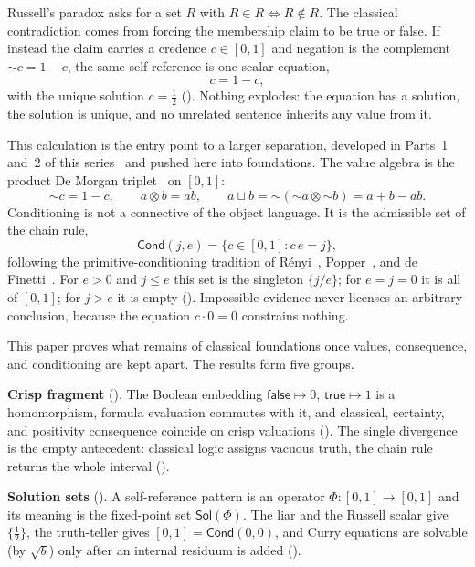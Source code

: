 \documentclass[11pt,a4paper]{article}
\newcommand{\negc}{\mathord{\sim}}
\newcommand{\conjc}{\otimes}
\newcommand{\disjc}{\sqcup}
\newcommand{\Cond}{\mathsf{Cond}}
\newcommand{\Sol}{\mathsf{Sol}}
\begin{document}
Russell's paradox asks for a set $R$ with
$R \in R \Leftrightarrow R \notin R$.
The classical contradiction comes from forcing the membership claim to
be true or false.
If instead the claim carries a credence $c \in [0,1]$ and negation is
the complement $\negc c = 1 - c$, the same self-reference is one scalar
equation,
\[
  c = 1 - c,
\]
with the unique solution $c = \tfrac12$ ().
Nothing explodes: the equation has a solution, the solution is unique,
and no unrelated sentence inherits any value from it.

This calculation is the entry point to a larger separation, developed
in Parts~1 and~2 of this series~\cite{part1,part2} and pushed here into
foundations.
The value algebra is the product De Morgan
triplet~\cite{klement2000,hajek1998} on $[0,1]$:
\[
  \negc c = 1 - c, \qquad
  a \conjc b = ab, \qquad
  a \disjc b = \negc(\negc a \conjc \negc b) = a + b - ab.
\]
Conditioning is not a connective of the object language.
It is the admissible set of the chain rule,
\[
  \Cond(j, e) = \{c \in [0,1] : c\,e = j\},
\]
following the primitive-conditioning tradition of
R\'enyi~\cite{renyi1955}, Popper~\cite{popper1959}, and
de Finetti~\cite{definetti1936}.
For $e > 0$ and $j \leq e$ this set is the singleton $\{j/e\}$; for
$e = j = 0$ it is all of $[0,1]$; for $j > e$ it is empty
().
Impossible evidence never licenses an arbitrary conclusion, because the
equation $c \cdot 0 = 0$ constrains nothing.

This paper proves what remains of classical foundations once values,
consequence, and conditioning are kept apart.
The results form five groups.

\textbf{Crisp fragment} ().
The Boolean embedding $\mathsf{false} \mapsto 0$,
$\mathsf{true} \mapsto 1$ is a homomorphism, formula evaluation
commutes with it, and classical, certainty, and positivity consequence
coincide on crisp valuations
().
The single divergence is the empty antecedent: classical logic assigns
vacuous truth, the chain rule returns the whole interval
().

\textbf{Solution sets} ().
A self-reference pattern is an operator $\Phi : [0,1] \to [0,1]$ and
its meaning is the fixed-point set $\Sol(\Phi)$.
The liar and the Russell scalar give $\{\tfrac12\}$, the truth-teller
gives $[0,1] = \Cond(0,0)$, and Curry equations are solvable
(by $\sqrt b$) only after an internal residuum is added
().
\end{document}
